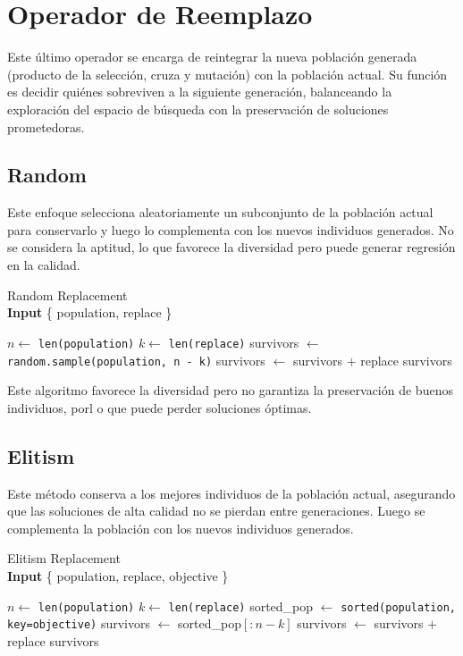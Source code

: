 \chapter{Operador de Reemplazo}

Este último operador se encarga de reintegrar la nueva población generada (producto de la selección, cruza y mutación) con la población actual. Su función es decidir quiénes sobreviven a la siguiente generación, balanceando la exploración del espacio de búsqueda con la preservación de soluciones prometedoras.

\section{Random}

Este enfoque selecciona aleatoriamente un subconjunto de la población actual para conservarlo y luego lo complementa con los nuevos individuos generados. No se considera la aptitud, lo que favorece la diversidad pero puede generar regresión en la calidad.

\begin{algorithm}[H]
	\caption{Random Replacement \\ \textbf{Input} \{ population, replace \}}
	\begin{algorithmic}[1]
		\State $n \gets$ \texttt{len(population)}
		\State $k \gets$ \texttt{len(replace)}
		\State survivors $\gets$ \texttt{random.sample(population, n - k)}
		\State survivors $\gets$ survivors $+$ replace
		\State \Return survivors
		\EndFunction
	\end{algorithmic}
	\label{alg:replacement_random}
\end{algorithm}

Este algoritmo favorece la diversidad pero no garantiza la preservación de buenos individuos, porl o que puede perder soluciones óptimas.

\section{Elitism}

Este método conserva a los mejores individuos de la población actual, asegurando que las soluciones de alta calidad no se pierdan entre generaciones. Luego se complementa la población con los nuevos individuos generados.

\begin{algorithm}[H]
	\caption{Elitism Replacement \\ \textbf{Input} \{ population, replace, objective \}}
	\begin{algorithmic}[1]
		\State $n \gets$ \texttt{len(population)}
		\State $k \gets$ \texttt{len(replace)}
		\State sorted\_pop $\gets$ \texttt{sorted(population, key=objective)}
		\State survivors $\gets$ sorted\_pop$[:n-k]$
		\State survivors $\gets$ survivors $+$ replace
		\State \Return survivors
		\EndFunction
	\end{algorithmic}
	\label{alg:replacement_elitism}
\end{algorithm}

